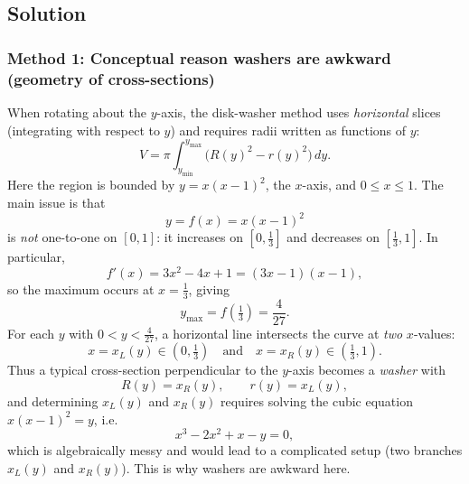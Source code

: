 \documentclass[12pt]{article}
\begin{document}
\begin{center}
\end{center}


\subsection*{Solution}

\subsubsection*{Method 1: Conceptual reason washers are awkward (geometry of cross-sections)}

When rotating about the \(y\)-axis, the disk-washer method uses \emph{horizontal} slices (integrating with respect to \(y\)) and requires radii written as functions of \(y\):
\[
V=\pi\int_{y_{\min}}^{y_{\max}}\big(R(y)^2-r(y)^2\big)\,dy.
\]
Here the region is bounded by \(y=x(x-1)^2\), the \(x\)-axis, and \(0\le x\le 1\). The main issue is that
\[
y=f(x)=x(x-1)^2
\]
is \emph{not} one-to-one on \([0,1]\): it increases on \([0,\tfrac13]\) and decreases on \([\tfrac13,1]\). In particular,
\[
f'(x)=3x^2-4x+1=(3x-1)(x-1),
\]
so the maximum occurs at \(x=\tfrac13\), giving
\[
y_{\max}=f\!\left(\tfrac13\right)=\frac{4}{27}.
\]
For each \(y\) with \(0<y<\frac{4}{27}\), a horizontal line intersects the curve at \emph{two} \(x\)-values:
\[
x=x_L(y)\in\left(0,\tfrac13\right)\quad\text{and}\quad x=x_R(y)\in\left(\tfrac13,1\right).
\]
Thus a typical cross-section perpendicular to the \(y\)-axis becomes a \emph{washer} with
\[
R(y)=x_R(y),\qquad r(y)=x_L(y),
\]
and determining \(x_L(y)\) and \(x_R(y)\) requires solving the cubic equation \(x(x-1)^2=y\), i.e.
\[
x^3-2x^2+x-y=0,
\]
which is algebraically messy and would lead to a complicated setup (two branches \(x_L(y)\) and \(x_R(y)\)). This is why washers are awkward here.
\end{document}
